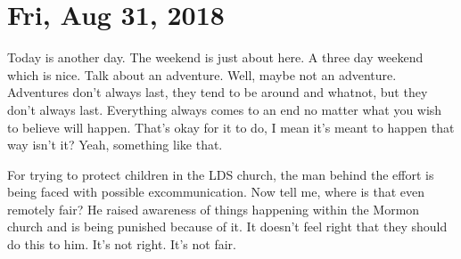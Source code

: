 \section{Fri, Aug 31, 2018}

Today is another day. The weekend is just about here. A three day weekend which is
nice. Talk about an adventure. Well, maybe not an adventure. Adventures don't always
last, they tend to be around and whatnot, but they don't always last. Everything
always comes to an end no matter what you wish to believe will happen. That's okay
for it to do, I mean it's meant to happen that way isn't it? Yeah, something like
that.

For trying to protect children in the LDS church, the man behind the effort is being
faced with possible excommunication. Now tell me, where is that even remotely fair?
He raised awareness of things happening within the Mormon church and is being
punished because of it. It doesn't feel right that they should do this to him. It's
not right. It's not fair.
